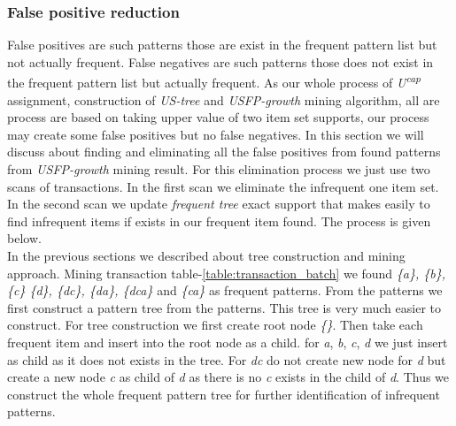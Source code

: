 \documentclass[conference]{IEEEtran}
\begin{document}
\subsubsection{False positive reduction}
    False positives are such patterns those are exist in the frequent pattern list but not actually frequent. False negatives are such patterns those does not exist in the frequent pattern list but actually frequent. As our whole process of \emph{U\textsuperscript{cap}} assignment, construction of \emph{US-tree} and \emph{USFP-growth} mining algorithm, all are process are based on taking upper value of two item set supports, our process may create some false positives but no false negatives. In this section we will discuss about finding and eliminating all the false positives from found patterns from \emph{USFP-growth} mining result. For this elimination process we just use two scans of transactions. In the first scan we eliminate the infrequent one item set. In the second scan we update \emph{frequent tree} exact support that makes easily to find infrequent items if exists in our frequent item found. The process is given below.\\
    In the previous sections we described about tree construction and mining approach. Mining transaction table-\ref{table:transaction_batch} we found \emph{\{a\}, \{b\}, \{c\} \{d\}, \{dc\}, \{da\}, \{dca\}} and \emph{\{ca\}} as frequent patterns. From the patterns we first construct a pattern tree from the patterns. This tree is very much easier to construct. For tree construction we first create root node \emph{\{\}}. Then take each frequent item and insert into the root node as a child. for \emph{a}, \emph{b}, \emph{c}, \emph{d} we just insert as child as it does not exists in the tree. For \emph{dc} do not create new node for \emph{d} but create a new node \emph{c} as child of \emph{d} as there is no \emph{c} exists in the child of \emph{d}. Thus we construct the whole frequent pattern tree for further identification of infrequent patterns. \\
\end{document}
